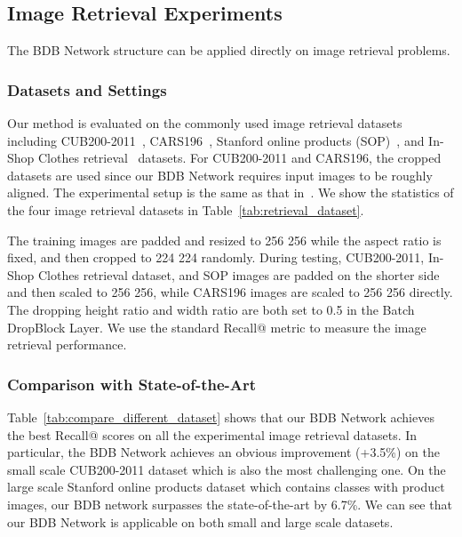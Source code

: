 \documentclass[10pt,twocolumn,letterpaper]{article}
\begin{document}
\subsection{Image Retrieval Experiments}
The BDB Network structure can be applied directly on image retrieval problems.
\vspace{-3mm}
\subsubsection{Datasets and Settings}
Our method is evaluated on the commonly used image retrieval datasets including CUB200-2011~\cite{wah2011caltech}, CARS196~\cite{krause20133d}, Stanford online products (SOP)~\cite{oh2016deep}, and In-Shop Clothes retrieval~\cite{liu2016deepfashion} datasets. 
For CUB200-2011 and CARS196, the cropped datasets are used since our BDB Network requires input images to be roughly aligned. 
The experimental setup is the same as that in~\cite{oh2016deep}.
We show the statistics of the four image retrieval datasets in Table~\ref{tab:retrieval_dataset}.



The training images are padded and resized to 256  256 while the aspect ratio is fixed, and then cropped to 224  224 randomly. During testing, CUB200-2011, In-Shop Clothes retrieval dataset, and SOP images are padded on the shorter side and then scaled to 256  256, while CARS196 images are scaled to 256  256 directly. The dropping height ratio and width ratio are both set to 0.5 in the Batch DropBlock Layer. We use the standard Recall@ metric to measure the image retrieval performance. 







\vspace{-3mm}
\subsubsection{Comparison with State-of-the-Art}\vspace{-1mm}
Table~\ref{tab:compare_different_dataset} shows that our BDB Network achieves the best Recall@ scores on all the experimental image retrieval datasets. 
In particular, the BDB Network achieves an obvious improvement (+3.5\%) on the small scale CUB200-2011 dataset which is also the most challenging one. 
On the large scale Stanford online products dataset which contains  classes with  product images, our BDB network surpasses the state-of-the-art by 6.7\%.
We can see that our BDB Network is applicable on both small and large scale datasets. 
\end{document}
